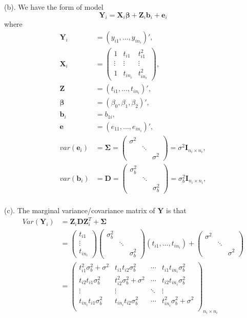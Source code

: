 \documentclass[letterpaper, 12pt]{article}
\newcommand{\ba}{$$\begin{aligned}}
\newcommand{\ea}{\end{aligned}$$}
\begin{document}
(b). We have the form of model 
$$
\bm{Y}_i=\bm{X}_i\bm{\beta}+\bm{Z}_i\bm{b}_i+\bm{e}_i
$$
where 
\ba
\bm{Y}_i&=(y_{i1},\dots,y_{in_i})',\\
\bm{X}_i&=\left(\begin{matrix}
1&t_{i1}&t_{i1}^2\\
\vdots&\vdots&\vdots\\
1&t_{in_i}&t_{in_i}^2\end{matrix}\right),\\
\bm{Z}&=(t_{i1},\dots,t_{in_i})',\\
\bm{\beta}&=(\beta_0,\beta_1,\beta_2)',\\
\bm{b}_i&=b_{1i},\\
\bm{e}&=(e_{11},\dots,e_{in_i})',\\
var(\bm{e}_i)&=\bm{\Sigma}=\left(\begin{matrix}
\sigma^2\\
&\ddots\\
&&\sigma^2\end{matrix}\right)=\sigma^2\bm{I}_{n_i\times n_i},\\
var(\bm{b}_i)&=\bm{D}=\left(\begin{matrix}
\sigma_b^2\\
&\ddots\\
&&\sigma_b^2\end{matrix}\right)=\sigma_b^2\bm{I}_{n_i\times n_i},\\
\ea


(c). The marginal variance/covariance matrix of $\bm{Y}$ is that
\ba
Var(\bm{Y}_i)&=\bm{Z}_i\bm{DZ}_i^T+\bm{\Sigma}\\
&=\left(\begin{matrix}
t_{i1}\\
\vdots\\
t_{in_i}\end{matrix}\right)
\left(\begin{matrix}
\sigma_b^2\\
&\ddots\\
&&\sigma_b^2\end{matrix}\right)
(t_{i1},\dots,t_{in_i})+\left(\begin{matrix}
\sigma^2\\
&\ddots\\
&&\sigma^2\end{matrix}\right)\\
&=\left(\begin{matrix}
t_{i1}^2\sigma_b^2+\sigma^2&t_{i1}t_{i2}\sigma_b^2&\cdots&t_{i1}t_{in_i}\sigma_b^2\\
t_{i2}t_{i1}\sigma_b^2&t_{i2}^2\sigma_b^2+\sigma^2&\cdots&t_{i2}t_{in_i}\sigma_b^2\\
\vdots&\vdots&\ddots&\vdots\\
t_{in_i}t_{i1}\sigma_b^2&t_{in_i}t_{i2}\sigma_b^2&\cdots&t_{in_i}^2\sigma_b^2+\sigma^2\\
\end{matrix}\right)_{n_i\times n_i}
\ea
\end{document}
